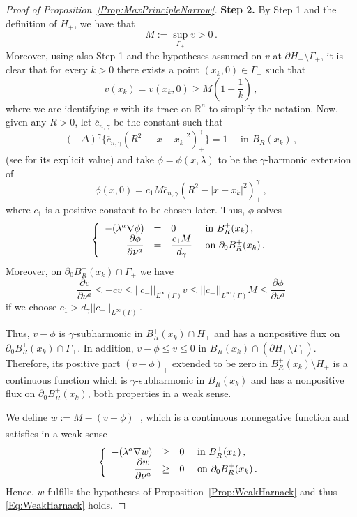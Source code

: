 \documentclass[12pt,reqno]{amsart}
\theoremstyle{definition}
\theoremstyle{remark}
\newcommand{\con}[1]{\mathbb{#1}}
\newcommand{\R}{\con{R}} %
\newcommand{\norm}[1]{\left | \left |{#1} \right | \right |}
\newcommand{\s}{\gamma}
\newcommand{\fraclaplacian}{(-\Delta)^\s}
\newcommand{\bpar}[1]{\left ( {#1}\right )}
\newcommand\beqc[1]{\left\{\begin{array}{#1}}
\newcommand\eeqc{\end{array} \right.}
\def\PDEsystem{rcll}
\let\div\relax
\DeclareMathOperator{\div}{div}
\numberwithin{equation}{section}
\begin{document}
\begin{proof}[Proof of Proposition~\ref{Prop:MaxPrincipleNarrow}]
	\textbf{Step 2.} By Step 1 and the definition of $H_+$, we have that
	\begin{equation}
	\label{Eq:PositiveSup}
	M := \sup_{\Gamma_+} v > 0\,.
	\end{equation}
	Moreover, using also Step 1 and the hypotheses assumed on $v$ at $\partial H_+\setminus \Gamma_+$, it is clear that for every $k > 0$ there exists a point $(x_k,0)\in \Gamma_+$ such that
	$$
	v(x_k) = v(x_k,0) \geq M \bpar{1- \dfrac{1}{k}}\,,
	$$
	where we are identifying $v$ with its trace on $\R^n$ to simplify the notation. Now, given any $R>0$, let $\overline{c}_{n,\s}$ be the constant such that
	$$
	\fraclaplacian \{ \overline{c}_{n,\s} (R^2 - |x-x_k|^2)^\s_+ \} = 1 \quad \text{ in } B_R (x_k)\,,
	$$
	(see \cite{BogdanEtAl} for its explicit value) and take $\phi = \phi(x,\lambda)$ to be the $\s$-harmonic extension of 
	$$
	\phi(x,0) = c_1 M  \overline{c}_{n,\s}  (R^2 - |x-x_k|^2)^\s_+\,,
	$$
	where $c_1$ is a positive constant to be chosen later. Thus, $\phi$ solves
	$$
	\beqc{\PDEsystem}
	-\div(\lambda^a \nabla \phi) &=& 0 & \text{ in } B^+_R(x_k)\,, \\
	\dfrac{\partial \phi}{\partial \nu^a} & = & \dfrac{c_1 M}{d_\s} & \text{ on } \partial_0 B^+_R(x_k)\,.
	\eeqc
	$$
	Moreover, on $\partial_0 B^+_R(x_k) \cap \Gamma_+$ we have
	$$
	\dfrac{\partial v}{\partial \nu^a} \leq - c v  \leq \norm{c_-}_{L^\infty (\Gamma)} v \leq  \norm{c_-}_{L^\infty (\Gamma)} M \leq \dfrac{\partial \phi}{\partial \nu^a}
	$$
	if we choose $c_1 > d_\s\norm{c_-}_{L^\infty (\Gamma)}$\,.
	
	Thus, $v-\phi$ is $\s$-subharmonic in $B^+_R(x_k) \cap  H_+$ and has a nonpositive flux on $\partial_0 B^+_R(x_k) \cap \Gamma_+$. In addition, $v-\phi \leq v \leq 0$ in $B_R^+(x_k)\cap (\partial  H_+ \setminus \Gamma_+)$. Therefore, its positive part $(v-\phi)_+$ extended to be zero in $B_R^+(x_k)\setminus  H_+ $ is a continuous function which is $\s$-subharmonic in $B^+_R(x_k)$ and has a nonpositive flux on $\partial_0 B^+_R(x_k)$, both properties in a weak sense.
	
	We define $w := M -(v-\phi)_+$, which is a continuous nonnegative function and satisfies in a weak sense
	$$
	\beqc{\PDEsystem}
	-\div(\lambda^a \nabla w) &\geq & 0 & \text{ in } B^+_R(x_k) \,, \\
	\dfrac{\partial w}{\partial \nu^a} & \geq & 0 & \text{ on } \partial_0 B^+_R(x_k)  \,.
	\eeqc
	$$
	Hence, $w$ fulfills the hypotheses of Proposition~\ref{Prop:WeakHarnack} and thus \eqref{Eq:WeakHarnack} holds.
	

\end{proof}
\end{document}
